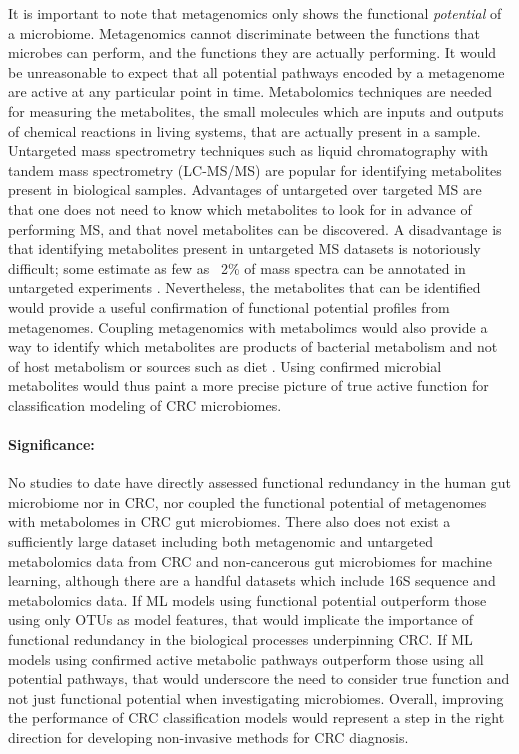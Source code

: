 \documentclass[11pt]{article}
\begin{document}
It is important to note that metagenomics only shows the functional \textit{potential} of a microbiome.
Metagenomics cannot discriminate between the functions that microbes can perform, and the functions they are actually performing.
It would be unreasonable to expect that all potential pathways encoded by a metagenome are active at any particular point in time.
Metabolomics techniques are needed for measuring the metabolites, the small molecules which are inputs and outputs of chemical reactions in living systems, that are actually present in a sample.
Untargeted mass spectrometry techniques such as liquid chromatography with tandem mass spectrometry (LC-MS/MS) are popular for identifying metabolites present in biological samples.
Advantages of untargeted over targeted MS are that one does not need to know which metabolites to look for in advance of performing MS, and that novel metabolites can be discovered.
A disadvantage is that identifying metabolites present in untargeted MS datasets is notoriously difficult; some estimate as few as ~2\% of mass spectra can be annotated in untargeted experiments \cite{da_silva_illuminating_2015}.
Nevertheless, the metabolites that can be identified would provide a useful confirmation of functional potential profiles from metagenomes.
Coupling metagenomics with metabolimcs would also provide a way to identify which metabolites are products of bacterial metabolism and not of host metabolism or sources such as diet \cite{shaffer_amon_2019}.
Using confirmed microbial metabolites would thus paint a more precise picture of true active function for classification modeling of CRC microbiomes.

\paragraph{Significance:} %
No studies to date have directly assessed functional redundancy in the human gut microbiome nor in CRC,
nor coupled the functional potential of metagenomes with metabolomes in CRC gut microbiomes.
There also does not exist a sufficiently large dataset including both metagenomic and untargeted metabolomics data from CRC and non-cancerous gut microbiomes for machine learning, although there are a handful datasets which include 16S sequence and metabolomics data.
If ML models using functional potential outperform those using only OTUs as model features,
that would implicate the importance of functional redundancy in the biological processes underpinning CRC.
If ML models using confirmed active metabolic pathways outperform those using all potential pathways,
that would underscore the need to consider true function and not just functional potential when investigating microbiomes.
Overall, improving the performance of CRC classification models would represent a step in the right direction for developing non-invasive methods for CRC diagnosis.
\end{document}

